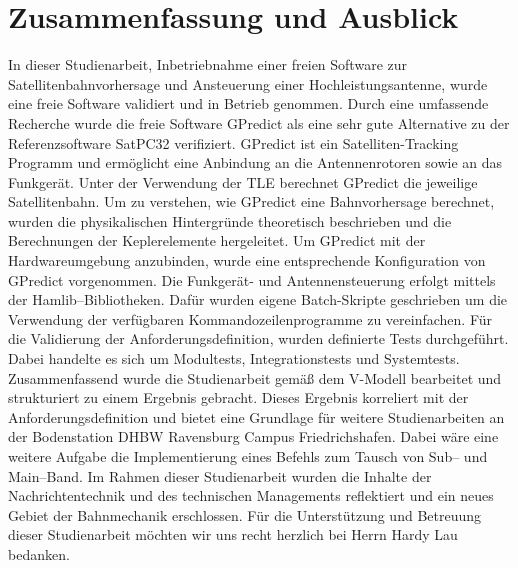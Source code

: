 
\chapter{Zusammenfassung und Ausblick}
In dieser Studienarbeit, Inbetriebnahme einer freien Software zur Satellitenbahnvorhersage und Ansteuerung einer Hochleistungsantenne, wurde eine 
freie Software validiert und in Betrieb genommen.
Durch eine umfassende Recherche wurde die freie Software GPredict als eine sehr gute Alternative zu 
der Referenzsoftware SatPC32 verifiziert. 
\newpar
GPredict ist ein Satelliten-Tracking Programm und ermöglicht eine Anbindung an die Antennenrotoren sowie 
an das Funkgerät. Unter der Verwendung der \ac{TLE} berechnet GPredict die jeweilige Satellitenbahn. Um zu verstehen, wie GPredict eine 
Bahnvorhersage berechnet, wurden die physikalischen Hintergründe theoretisch beschrieben und die Berechnungen der Keplerelemente hergeleitet.
\newpar
Um GPredict mit der Hardwareumgebung anzubinden, wurde eine entsprechende Konfiguration von GPredict vorgenommen. Die Funkgerät- und Antennensteuerung 
erfolgt mittels der Hamlib--Bibliotheken. Dafür wurden eigene Batch-Skripte geschrieben um die Verwendung der verfügbaren Kommandozeilenprogramme zu 
vereinfachen. 
\newpar
Für die Validierung der Anforderungsdefinition, wurden definierte Tests durchgeführt. Dabei handelte es sich um Modultests, Integrationstests und 
Systemtests. 
\newpar
Zusammenfassend wurde die Studienarbeit gemäß dem V-Modell bearbeitet und strukturiert zu einem Ergebnis gebracht. Dieses Ergebnis korreliert mit der 
Anforderungsdefinition und bietet eine Grundlage für weitere Studienarbeiten an der Bodenstation DHBW Ravensburg Campus Friedrichshafen. Dabei wäre 
eine weitere Aufgabe die Implementierung eines Befehls zum Tausch von Sub-- und Main--Band.
\newpar
Im Rahmen dieser Studienarbeit wurden die Inhalte der Nachrichtentechnik und des technischen Managements reflektiert und ein neues Gebiet der 
Bahnmechanik erschlossen. Für die Unterstützung und Betreuung dieser Studienarbeit möchten wir uns recht herzlich bei Herrn Hardy Lau bedanken.
\clearpage
